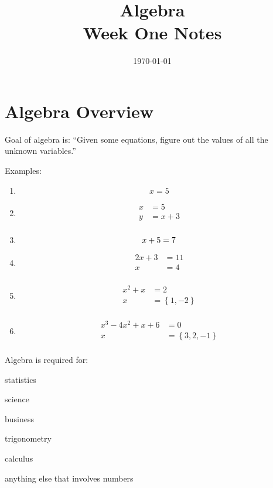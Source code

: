 \documentclass[letterpaper, landscape]{exam}
\title{Algebra \\ Week One Notes}
\author{}
\date{\today}
\begin{document}
  
    \maketitle
  
    \section{Algebra Overview} %
    
    Goal of algebra is: ``Given some equations, figure out the values of all the unknown variables.''
  
    Examples:
  
    \begin{enumerate}
      \item 
        \[
          x = 5
        \]
  
      \item
        \begin{align*}
          x & = 5 \\
          y & = x + 3 \\
        \end{align*}
  
      \item
        \[
          x + 5 = 7 \\
        \]
  
      \item
        \begin{align*}
          2x + 3 & = 11 \\
          x      & = 4 \\
        \end{align*}
  
      \item
        \begin{align*}
          x^2 + x & = 2 \\
          x       & = \left\{ 1, -2 \right\} \\
        \end{align*}
  
      \item 
        \begin{align*}
          x^3 - 4x^2 + x + 6 & = 0 \\
          x                  & = \left\{ 3, 2, -1 \right\} \\
        \end{align*}
    \end{enumerate}
  
    Algebra is required for:
    \begin{itemize*}
      \item statistics
      \item science
      \item business
      \item trigonometry
      \item calculus
      \item anything else that involves numbers
    \end{itemize*}
  
\end{document}
